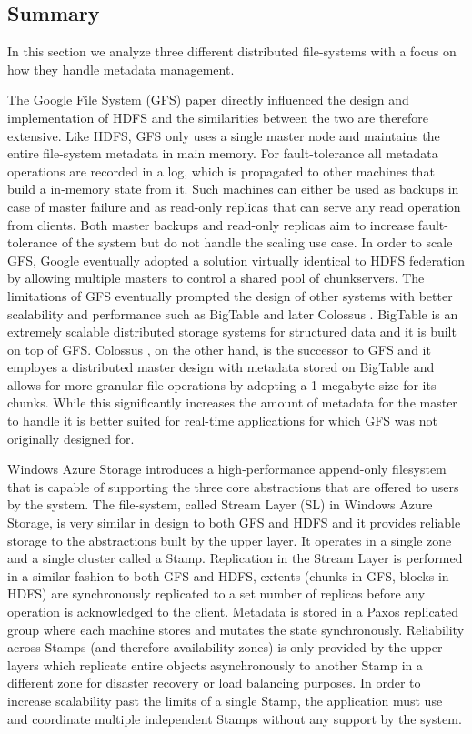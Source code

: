 \subsection{Summary}
In this section we analyze three different distributed file-systems with a focus on how they handle metadata management.

The Google File System (GFS) paper \cite{DBLP:conf/sosp/GhemawatGL03} directly influenced the design and implementation of HDFS and the similarities between the two are therefore extensive.
Like HDFS, GFS only uses a single master node and maintains the entire file-system metadata in main memory.
For fault-tolerance all metadata operations are recorded in a log, which is propagated to other machines that build a in-memory state from it.
Such machines can either be used as backups in case of master failure and as read-only replicas that can serve any read operation from clients.
Both master backups and read-only replicas aim to increase fault-tolerance of the system but do not handle the scaling use case.
In order to scale GFS, Google eventually adopted a solution virtually identical to HDFS federation by allowing multiple masters to control a shared pool of chunkservers.
The limitations of GFS eventually prompted the design of other systems with better scalability and performance such as BigTable and later Colossus \cite{DBLP:journals/cacm/McKusickQ10}.
BigTable \cite{DBLP:conf/osdi/ChangDGHWBCFG06} is an extremely scalable distributed storage systems for structured data and it is built on top of GFS.
Colossus \cite{DBLP:journals/cacm/McKusickQ10}, on the other hand, is the successor to GFS and it employes a distributed master design with metadata stored on BigTable and allows for more granular file operations by adopting a 1 megabyte size for its chunks.
While this significantly increases the amount of metadata for the master to handle it is better suited for real-time applications for which GFS was not originally designed for.

Windows Azure Storage \cite{DBLP:conf/sosp/CalderWONSMXSWSHUKEBMAAHHBDAMSMR11} introduces a high-performance append-only filesystem that is capable of supporting the three core abstractions that are offered to users by the system.
The file-system, called Stream Layer (SL) in Windows Azure Storage, is very similar in design to both GFS and HDFS and it provides reliable storage to the abstractions built by the upper layer.
It operates in a single zone and a single cluster called a Stamp.
Replication in the Stream Layer is performed in a similar fashion to both GFS and HDFS, extents (chunks in GFS, blocks in HDFS) are synchronously replicated to a set number of replicas before any operation is acknowledged to the client.
Metadata is stored in a Paxos replicated group where each machine stores and mutates the state synchronously.
Reliability across Stamps (and therefore availability zones) is only provided by the upper layers which replicate entire objects asynchronously to another Stamp in a different zone for disaster recovery or load balancing purposes.
In order to increase scalability past the limits of a single Stamp, the application must use and coordinate multiple independent Stamps without any support by the system.

